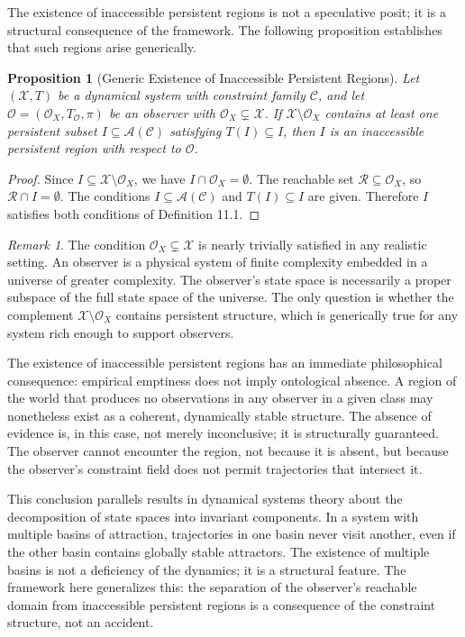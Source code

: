 \documentclass[12pt, a4paper, oneside]{article}
\theoremstyle{plain}
\newtheorem{proposition}[theorem]{Proposition}
\theoremstyle{definition}
\theoremstyle{remark}
\newtheorem{remark}[theorem]{Remark}
\newcommand{\X}{\mathcal{X}}
\newcommand{\C}{\mathcal{C}}
\newcommand{\Obs}{\mathcal{O}}
\newcommand{\R}{\mathcal{R}}
\newcommand{\A}{\mathcal{A}}
\newcommand{\T}{T}
\newcommand{\proj}{\pi}
\begin{document}
The existence of inaccessible persistent regions is not a speculative posit; it is a structural consequence of the framework. The following proposition establishes that such regions arise generically.

\begin{proposition}[Generic Existence of Inaccessible Persistent Regions]
\label{prop:islands}
Let $(\X, \T)$ be a dynamical system with constraint family $\C$, and let $\Obs = (\Obs_X, \T_\Obs, \proj)$ be an observer with $\Obs_X \subsetneq \X$. If $\X \setminus \Obs_X$ contains at least one persistent subset $I \subseteq \A(\C)$ satisfying $\T(I) \subseteq I$, then $I$ is an inaccessible persistent region with respect to $\Obs$.
\end{proposition}

\begin{proof}
Since $I \subseteq \X \setminus \Obs_X$, we have $I \cap \Obs_X = \emptyset$. The reachable set $\R \subseteq \Obs_X$, so $\R \cap I = \emptyset$. The conditions $I \subseteq \A(\C)$ and $\T(I) \subseteq I$ are given. Therefore $I$ satisfies both conditions of Definition 11.1.
\end{proof}

\begin{remark}
The condition $\Obs_X \subsetneq \X$ is nearly trivially satisfied in any realistic setting. An observer is a physical system of finite complexity embedded in a universe of greater complexity. The observer's state space is necessarily a proper subspace of the full state space of the universe. The only question is whether the complement $\X \setminus \Obs_X$ contains persistent structure, which is generically true for any system rich enough to support observers.
\end{remark}

The existence of inaccessible persistent regions has an immediate philosophical consequence: empirical emptiness does not imply ontological absence. A region of the world that produces no observations in any observer in a given class may nonetheless exist as a coherent, dynamically stable structure. The absence of evidence is, in this case, not merely inconclusive; it is structurally guaranteed. The observer cannot encounter the region, not because it is absent, but because the observer's constraint field does not permit trajectories that intersect it.

This conclusion parallels results in dynamical systems theory about the decomposition of state spaces into invariant components. In a system with multiple basins of attraction, trajectories in one basin never visit another, even if the other basin contains globally stable attractors. The existence of multiple basins is not a deficiency of the dynamics; it is a structural feature. The framework here generalizes this: the separation of the observer's reachable domain from inaccessible persistent regions is a consequence of the constraint structure, not an accident.
\end{document}
